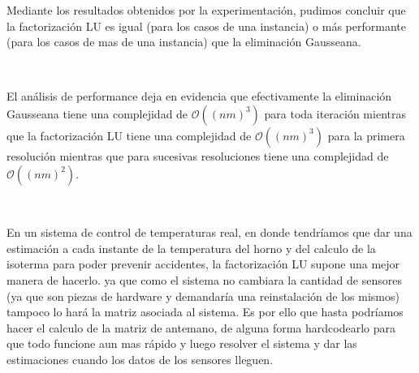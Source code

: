 Mediante los resultados obtenidos por la experimentaci\'on, pudimos concluir que la factorizaci\'on LU es igual (para los casos de una instancia) o m\'as performante (para los casos de mas de una instancia) que la eliminaci\'on Gausseana. 

~

El an\'alisis de performance deja en evidencia que efectivamente la eliminaci\'on Gausseana tiene una complejidad de $\mathcal{O}((nm)^3)$ para toda iteraci\'on mientras que la factorizaci\'on LU tiene una complejidad de $\mathcal{O}((nm)^3)$ para la primera resoluci\'on mientras que para sucesivas resoluciones tiene una complejidad de $\mathcal{O}((nm)^2)$.

~

En un sistema de control de temperaturas real, en donde tendr\'iamos que dar una estimaci\'on a cada instante de la temperatura del horno y del calculo de la isoterma para poder prevenir accidentes, la factorizaci\'on LU supone una mejor manera de hacerlo. ya que como el sistema no cambiara la cantidad de sensores (ya que son piezas de hardware y demandar\'ia una reinstalaci\'on de los mismos) tampoco lo har\'a la matriz asociada al sistema. Es por ello que hasta podr\'iamos hacer el calculo de la matriz de antemano, de alguna forma hardcodearlo para que todo funcione aun mas r\'apido y luego resolver el sistema y dar las estimaciones cuando los datos de los sensores lleguen.
